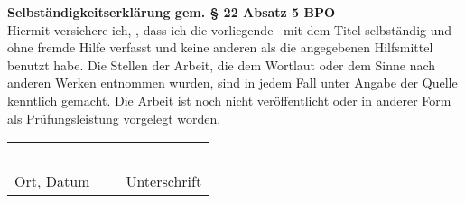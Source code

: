 \vspace*{\fill}
\begin{minipage}[b]{\textwidth}
 

\textbf{Selbständigkeitserklärung gem. § 22 Absatz 5 BPO}
\\

Hiermit versichere ich, \theauthor, 
dass ich die vorliegende \insertdoctitel\  mit dem Titel \qde{\thetitle}
selbständig und ohne fremde Hilfe verfasst und keine anderen als die angegebenen Hilfsmittel benutzt habe. 
Die Stellen der Arbeit, die dem Wortlaut oder dem Sinne nach anderen Werken entnommen wurden, sind in jedem Fall unter Angabe der Quelle kenntlich gemacht. 
Die Arbeit ist noch nicht veröffentlicht oder in anderer Form als Prüfungsleistung vorgelegt worden.

\vspace{4cm}

\begin{center}
\begin{tabular}{ p{} p{} p{} }
\ 			& \  		& 	\  			\\ 
\cline{1-1} \cline{3-3}
Ort, Datum 		& \ 	 	&	Unterschrift 		\\
\end{tabular}
\end{center}

\end{minipage}
\vspace*{\fill}